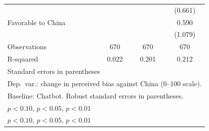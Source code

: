 {\begin{tabular}{l*{3}{c}}
                    &                     &                     &     (0.661)         \\
\addlinespace
Favorable to China  &                     &                     &       0.590         \\
                    &                     &                     &     (1.079)         \\
\midrule
Observations        &         670         &         670         &         670         \\
R-squared           &       0.022         &       0.201         &       0.212         \\
\bottomrule
\multicolumn{4}{l}{\footnotesize Standard errors in parentheses}\\
\multicolumn{4}{l}{\footnotesize Dep.\ var.: change in perceived bias against China (0--100 scale).}\\
\multicolumn{4}{l}{\footnotesize Baseline: Chatbot. Robust standard errors in parentheses.}\\
\multicolumn{4}{l}{\footnotesize \sym{*} \(p<0.10\), \sym{**} \(p<0.05\), \sym{***} \(p<0.01\)}\\
\multicolumn{4}{l}{\footnotesize \sym{*} \(p<0.10\), \sym{**} \(p<0.05\), \sym{***} \(p<0.01\)}\\
\end{tabular}
}
